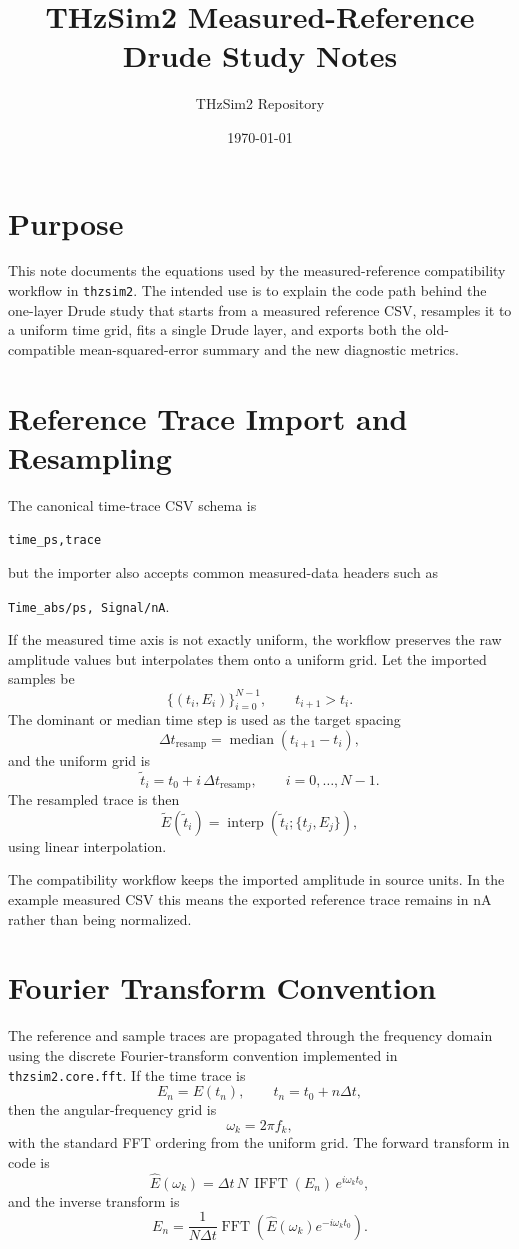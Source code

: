 \documentclass[11pt]{article}
\title{THzSim2 Measured-Reference Drude Study Notes}
\author{THzSim2 Repository}
\date{\today}
\begin{document}
\maketitle

\section{Purpose}
This note documents the equations used by the measured-reference compatibility workflow in
\texttt{thzsim2}. The intended use is to explain the code path behind the one-layer Drude
study that starts from a measured reference CSV, resamples it to a uniform time grid, fits a
single Drude layer, and exports both the old-compatible mean-squared-error summary and the new
diagnostic metrics.

\section{Reference Trace Import and Resampling}
The canonical time-trace CSV schema is
\begin{center}
\texttt{time\_ps,trace}
\end{center}
but the importer also accepts common measured-data headers such as
\begin{center}
\texttt{Time\_abs/ps, Signal/nA}.
\end{center}

If the measured time axis is not exactly uniform, the workflow preserves the raw amplitude
values but interpolates them onto a uniform grid. Let the imported samples be
\[
\{(t_i, E_i)\}_{i=0}^{N-1},
\qquad
t_{i+1} > t_i.
\]
The dominant or median time step is used as the target spacing
\[
\Delta t_{\mathrm{resamp}} = \operatorname{median}(t_{i+1}-t_i),
\]
and the uniform grid is
\[
\tilde{t}_i = t_0 + i \, \Delta t_{\mathrm{resamp}},
\qquad i = 0,\dots,N-1.
\]
The resampled trace is then
\[
\tilde{E}(\tilde{t}_i) = \operatorname{interp}\!\left(\tilde{t}_i; \{t_j,E_j\}\right),
\]
using linear interpolation.

The compatibility workflow keeps the imported amplitude in source units. In the example
measured CSV this means the exported reference trace remains in \si{\nano\ampere} rather than
being normalized.

\section{Fourier Transform Convention}
The reference and sample traces are propagated through the frequency domain using the discrete
Fourier-transform convention implemented in \texttt{thzsim2.core.fft}. If the time trace is
\[
E_n = E(t_n), \qquad t_n = t_0 + n \Delta t,
\]
then the angular-frequency grid is
\[
\omega_k = 2\pi f_k,
\]
with the standard FFT ordering from the uniform grid. The forward transform in code is
\[
\hat{E}(\omega_k) = \Delta t \, N \, \operatorname{IFFT}(E_n) \, e^{i \omega_k t_0},
\]
and the inverse transform is
\[
E_n = \frac{1}{N \Delta t}\operatorname{FFT}\!\left(\hat{E}(\omega_k)e^{-i\omega_k t_0}\right).
\]
\end{document}
